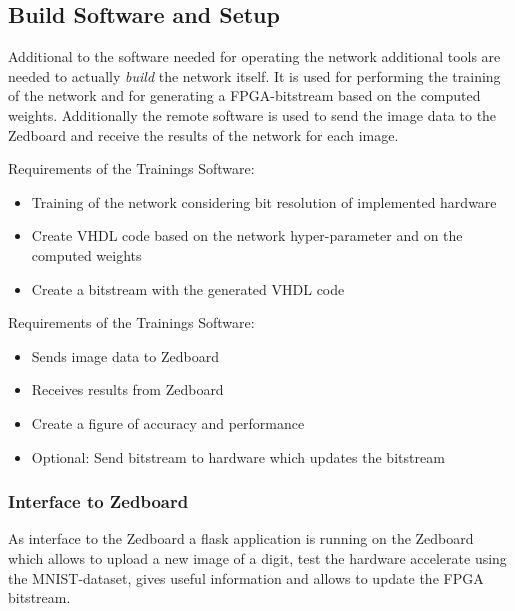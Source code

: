 \subsection{Build Software and Setup}

Additional to the software needed for operating the network additional tools are needed to actually \emph{build} the network itself. 
It is used for performing the training of the network and for generating a FPGA-bitstream based on the computed weights. Additionally the remote software is used to send the image data to the Zedboard and receive the results of the network for each image. 



Requirements of the Trainings Software:
\begin{itemize} 
	\item Training of the network considering bit resolution of implemented hardware
	\item Create VHDL code based on the network hyper-parameter and on the computed weights
	\item Create a bitstream with the generated VHDL code
\end{itemize}

Requirements of the Trainings Software:
\begin{itemize}
	\item Sends image data to Zedboard
	\item Receives results from Zedboard
	\item Create a figure of accuracy and performance   
	\item Optional: Send bitstream to hardware which updates the bitstream 
\end{itemize}

\subsubsection{Interface to Zedboard} \label{subsec:InterfaceRemoteZed}
As interface to the Zedboard a flask application is running on the Zedboard which allows to upload a new image of a digit, test the hardware accelerate using the MNIST-dataset, gives useful information and allows to update the FPGA bitstream. 




